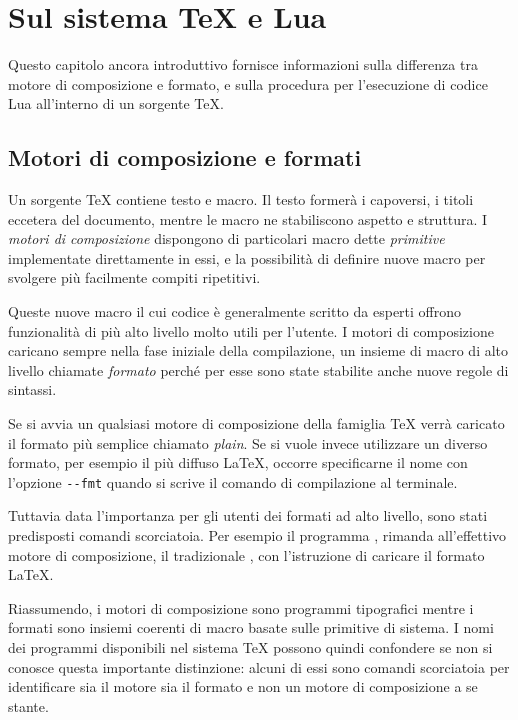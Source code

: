 

\chapter{Sul sistema \TeX{} e Lua}
\label{iichExplain}

Questo capitolo ancora introduttivo fornisce informazioni sulla differenza tra
motore di composizione e formato, e sulla procedura per l'esecuzione di codice
Lua all'interno di un sorgente \TeX.


\section{Motori di composizione e formati}

Un sorgente \TeX{} contiene testo e macro. Il testo formerà i capoversi, i
titoli eccetera del documento, mentre le macro ne stabiliscono aspetto e
struttura. I \emph{motori di composizione} dispongono di particolari macro dette
\emph{primitive} implementate direttamente in essi, e la possibilità di definire
nuove macro per svolgere più facilmente compiti ripetitivi.

Queste nuove macro il cui codice è generalmente scritto da esperti offrono
funzionalità di più alto livello molto utili per l'utente. I motori di
composizione caricano sempre nella fase iniziale della compilazione, un insieme
di macro di alto livello chiamate \emph{formato} perché per esse sono state
stabilite anche nuove regole di sintassi.

Se si avvia un qualsiasi motore di composizione della famiglia \TeX{} verrà
caricato il formato più semplice chiamato \emph{plain}. Se si vuole invece
utilizzare un diverso formato, per esempio il più diffuso \LaTeX{}, occorre
specificarne il nome con l'opzione \texttt{-{}-fmt} quando si scrive il comando
di compilazione al terminale.

Tuttavia data l'importanza per gli utenti dei formati ad alto livello, sono
stati predisposti comandi scorciatoia. Per esempio il programma
, rimanda all'effettivo motore di composizione, il tradizionale
, con l'istruzione di caricare il formato \LaTeX.

Riassumendo, i motori di composizione sono programmi tipografici mentre i
formati sono insiemi coerenti di macro basate sulle primitive di sistema. I nomi
dei programmi disponibili nel sistema \TeX{} possono quindi confondere se non si
conosce questa importante distinzione: alcuni di essi sono comandi scorciatoia
per identificare sia il motore sia il formato e non un motore di composizione a
se stante.


